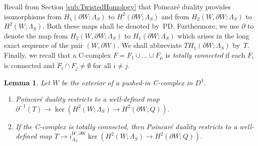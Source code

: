 \documentclass[11pt,a4paper]{amsart}
\newtheorem{lemma}[theorem]{Lemma}
\theoremstyle{definition}
\begin{document}
Recall from Section \ref{sub:TwistedHomology} that Poincar\'e duality provides isomorphisms from $H_1(\partial W;\Lambda_S)$ to $H^2(\partial W;\Lambda_S)$ and from $H_2(W,\partial W;\Lambda_S)$ to $H^2(W;\Lambda_S)$. Both these maps shall be denoted by~$\text{PD}$. Furthermore, we use $\partial$ to denote the map from $H_2(W,\partial W;\Lambda_S)$ to $H_1(\partial W;\Lambda_S)$ which arises in the long exact sequence of the pair $(W,\partial W)$. We shall abbreviate $TH_1(\partial W;\Lambda_S)$ by~$T$. Finally, we recall that a C-complex $F = F_1 \cup \ldots \cup F_\mu$ is \emph{totally connected} if each $F_i$ is connected and $F_i \cap F_j  \neq \emptyset $ for all $i\neq j$.

\begin{lemma}
\label{lem:PDBienDef}
Let $W$ be the exterior of a pushed-in C-complex in $D^4$.
\begin{enumerate}
\item Poincar\'e duality restricts to a well-defined map $ \partial^{-1}(T) \to  \ker(H^2(W;\Lambda_S) \to H^2(\partial W;Q)).$
\item If the C-complex is totally connected, then Poincar\'e duality restricts to a well-defined map  $ T  \to   i_{\Lambda_S}^{W,\partial W} \ker(H^2(W;\Lambda_S) \to H^2(\partial W;Q)).$ 
\end{enumerate}
\end{lemma}
\end{document}
